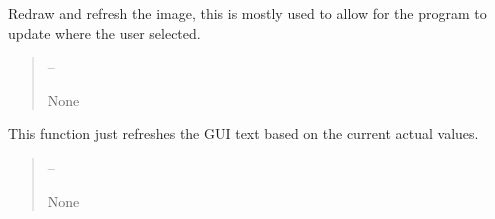 \documentclass[letterpaper,11pt,english]{sphinxmanual}
\begin{document}
\begin{savenotes}
\begin{fulllineitems}
\begin{savenotes}\begin{fulllineitems}
\label{\detokenize{code/opihiexarata.gui.selector:opihiexarata.gui.selector.TargetSelectorWindow.__refresh_image}}
\pysigstartsignatures
{}
\pysigstopsignatures
\sphinxAtStartPar
Redraw and refresh the image, this is mostly used to allow for the
program to update where the user selected.
\begin{quote}\begin{description}
\sphinxAtStartPar
{} – 

\sphinxAtStartPar
None

\end{description}\end{quote}

\end{fulllineitems}\end{savenotes}


\begin{savenotes}\begin{fulllineitems}
\label{\detokenize{code/opihiexarata.gui.selector:opihiexarata.gui.selector.TargetSelectorWindow.__refresh_text}}
\pysigstartsignatures
{}
\pysigstopsignatures
\sphinxAtStartPar
This function just refreshes the GUI text based on the current
actual values.
\begin{quote}\begin{description}
\sphinxAtStartPar
{} – 

\sphinxAtStartPar
None

\end{description}\end{quote}

\end{fulllineitems}\end{savenotes}



\end{fulllineitems}
\end{savenotes}
\end{document}
